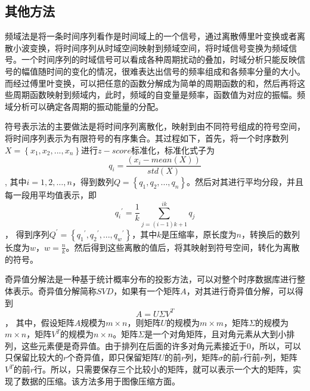 \subsection{其他方法}
频域法是将一条时间序列看作是时间域上的一个信号，通过离散傅里叶变换或者离散小波变换，将时间序列从时域空间映射到频域空间，将时域信号变换为频域信号。一个时间序列的时域信号可以看成各种周期扰动的叠加，时域分析只能反映信号的幅值随时间的变化的情况，很难表达出信号的频率组成和各频率分量的大小。而经过傅里叶变换，可以把任意的函数分解成为简单的周期函数的和，然后再将这些周期函数映射到频域内，此时，频域的自变量是频率，函数值为对应的振幅。频域分析可以确定各周期的振动能量的分配。

符号表示法的主要做法是将时间序列离散化，映射到由不同符号组成的符号空间，将时间序列表示为有限符号的有序集合。其过程如下，首先，将一个时序数列$X = \left \{ x_{1}, x_{2}, ..., x_{n} \right \}$进行$z-score$标准化，标准化式子为
\begin{equation}
q_{i}=\frac{\left ( x_{i}-mean\left ( X \right ) \right )}{std\left ( X \right )}
\end{equation},
其中$ i = 1, 2, … , n$，得到数列$Q = \left \{ q_{1}, q_{2},..., q_{n} \right \}$。然后对其进行平均分段，并且每一段用平均值表示，即
\begin{equation}
{q_{i}}^{'} = \frac{1}{k}\sum_{j=\left ( i-1 \right )k+1}^{ik}q_{j}
\end{equation}，
得到序列$Q^{'}=\left \{{q_{1}}^{'}, {q_{2}}^{'}, ... , {q_{w}}^{'} \right \}$，其中$k$是压缩率，原长度为$n$，转换后的数列长度为$w$，$w = \frac{n}{k}$。然后得到这些离散的值后，将其映射到符号空间，转化为离散的符号。

奇异值分解法是一种基于统计概率分布的投影方法，可以对整个时序数据库进行整体表示。奇异值分解简称$SVD$，如果有一个矩阵$A$，对其进行奇异值分解，可以得到
\begin{equation}
A=U\Sigma V^T
\end{equation}，
其中，假设矩阵$A$规模为$m\times n$，则矩阵$U$的规模为$m\times m$，矩阵$\Sigma$的规模为$m\times n$，矩阵$V^T$的规模为$n\times n$。矩阵$\Sigma$是一个对角矩阵，且对角元素从大到小排列，这些元素便是奇异值。由于排列在后面的许多对角元素接近于$0$，所以，可以只保留比较大的$r$个奇异值，即只保留矩阵$U$的前$r$列，矩阵$\sigma$的前$r$行前$r$列，矩阵$V^T$的前$r$行。所以，只需要保存三个比较小的矩阵，就可以表示一个大的矩阵，实现了数据的压缩。该方法多用于图像压缩方面。
